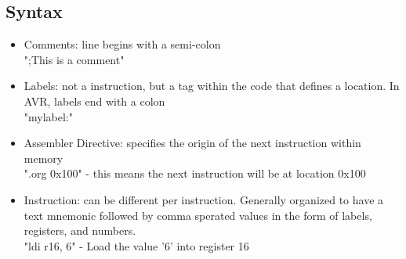 \documentclass{article}
\begin{document}
\subsection{Syntax}
\begin{itemize}
  \item Comments: line begins with a semi-colon\\
  ";This is a comment"
  \item Labels: not a instruction, but a tag within the code that defines a location. In AVR, labels end with a colon\\
  "mylabel:"
  \item Assembler Directive: specifies the origin of the next instruction within memory\\
  ".org 0x100" - this means the next instruction will be at location 0x100
  \item Instruction: can be different per instruction. Generally organized to have a text mnemonic followed by comma sperated values in the form of labels, registers, and numbers.\\
  "ldi r16, 6" - Load the value '6' into register 16
\end{itemize}
\end{document}
